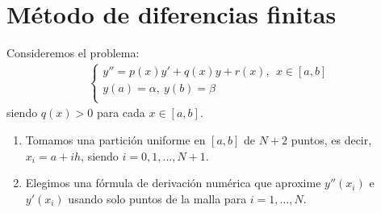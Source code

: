 \section{Método de diferencias finitas}
\noindent Consideremos el problema:
\begin{align*}
    \left\{ \begin{array}{lcc}
             y'' = p(x)y' + q(x)y + r(x), \ \ x \in [a,b]\\
             y(a) = \alpha, \ y(b) = \beta \\
             \end{array}
   \right.
\end{align*}
siendo $q(x) > 0$ para cada $x \in [a,b]$. 
\begin{enumerate}
    \item Tomamos una partición uniforme en $[a,b]$ de $N+2$ puntos, es decir, $x_i = a +ih$, siendo $i = 0,1,\ldots,N+1$.
    \item Elegimos una fórmula de derivación numérica que aproxime $y''(x_i)$ e  $y'(x_i)$ usando solo puntos de la malla para $i = 1,\ldots,N$.
\end{enumerate}

